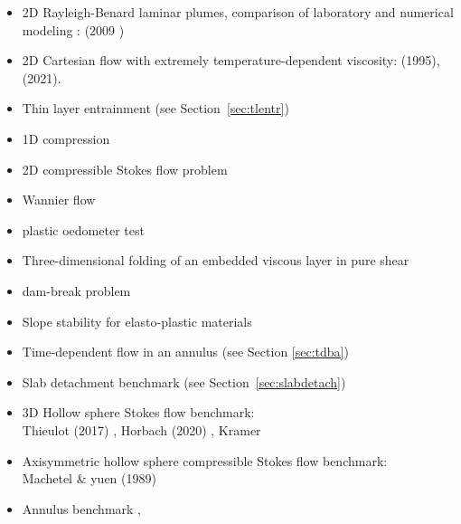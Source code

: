 \begin{itemize}

\item 2D Rayleigh-Benard laminar plumes, comparison of laboratory 
      and numerical modeling : 
      \textcite{vavl09} (2009
)
\item 2D Cartesian flow with extremely temperature-dependent viscosity:
      \textcite{moso95} (1995), \textcite{trbs21} (2021).

\item Thin layer entrainment (see Section~\ref{sec:tlentr})

\item 1D compression \cite{modm02}

\item 2D compressible Stokes flow problem \cite{itki94,tagu07,lezh08,kilv10,lizh13}

\item Wannier flow \cite{wann50,yemu99,cehg14}

\item plastic oedometer test  \cite{chtl13}

\item Three-dimensional folding of an embedded viscous layer in 
      pure shear \cite{flet91}

\item dam-break problem 
      \cite{moeb99,bacp07,liir07,lemx08,homa09,anco09,grdn97,hini81,basd08}

\item Slope stability for elasto-plastic materials \cite{rama16}

\item Time-dependent flow in an annulus \cite{galb19} (see Section \ref{sec:tdba})

\item Slab detachment benchmark (see Section~\ref{sec:slabdetach}) 

\item 3D Hollow sphere Stokes flow benchmark:\\
      Thieulot (2017) \cite{thie17},
      Horbach \etal (2020) \cite{homb20},
      Kramer \etal \cite{krdw21}

\item Axisymmetric hollow sphere compressible Stokes flow benchmark:\\
      Machetel \& yuen (1989) \cite{mayu89}

\item Annulus benchmark \cite{aspectmanual}, \cite{ples11}


\end{itemize}
